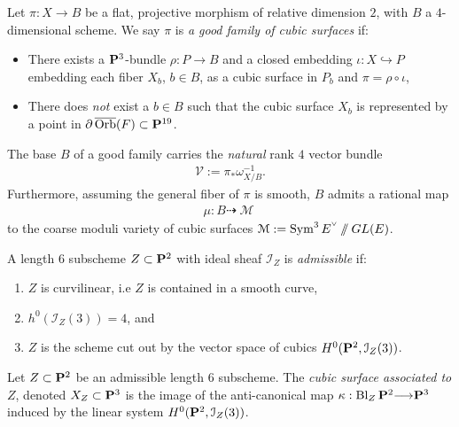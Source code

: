 \documentclass[12pt,reqno]{amsart}
\DeclareMathOperator{\Bl}{Bl}
\DeclareMathOperator{\Orb}{\overline{Orb}}
\DeclareMathOperator{\M}{\mathcal{M}}
\renewcommand{\to}{{\longrightarrow}}
\numberwithin{equation}{section}
\newcommand{\V}{\mathcal V}
\newcommand{\smvee}{\raise0.5ex\hbox{$\scriptscriptstyle\vee$}}
\begin{document}
\begin{definition}
\label{def:goodfamily}
Let $\pi :X \to B$ be a flat, projective morphism of relative
dimension $2$, with $B$ a $4$-dimensional scheme. We say $\pi$ is {\sl
  a good family of cubic surfaces} if:
\begin{itemize}
\item There exists a $\P^3$-bundle $\rho: P \to B$ and a closed
  embedding $\iota: X \hookrightarrow P$ embedding each fiber $X_b$,
  $b \in B$, as a cubic surface in $P_b$ and $\pi = \rho \circ \iota$,
\item There does {\sl not} exist a $b \in B$ such that the cubic
  surface $X_b$ is represented by a point in
  $\partial \Orb(F) \subset \P^{19}$.
\end{itemize}
\end{definition}

The base $B$ of a good family carries the {\sl natural} rank $4$
vector bundle
\begin{align}
  \label{eq:V}
  \V := \pi_{*}\omega_{X/B}^{-1}.
\end{align}
Furthermore, assuming the general fiber of $\pi$ is smooth, $B$ admits
a rational map
\begin{align}
  \label{eq:mu}
  \mu: B \dashrightarrow \M
\end{align}
to the coarse moduli variety of cubic surfaces
$\mathcal{M} := \Sym^{3}E^{\smvee} \sslash GL(E)$.




\begin{definition}
  \label{def:admissible} A length $6$ subscheme $Z \subset \P^{2}$
  with ideal sheaf $\mathcal{I}_{Z}$ is {\sl admissible} if:
  \begin{enumerate}
  \item $Z$ is curvilinear, i.e $Z$ is contained in a smooth curve,
  \item $h^{0}(\mathcal{I}_Z(3)) = 4$, and
  \item $Z$ is the scheme cut out by the vector space of cubics
    $H^0(\P^2, \mathcal{I}_Z(3))$.
  \end{enumerate}
\end{definition}

\begin{definition}
  \label{def:cubicZ} Let $Z \subset \P^2$ be an admissible length $6$
  subscheme.  The {\sl cubic surface associated to $Z$}, denoted
  $X_Z \subset \P^3$ is the image of the anti-canonical map
  $\kappa: \Bl_{Z}\P^2 \to \P^3$ induced by the linear system
  $H^0(\P^2,\mathcal{I}_Z(3))$.
\end{definition}
\end{document}
